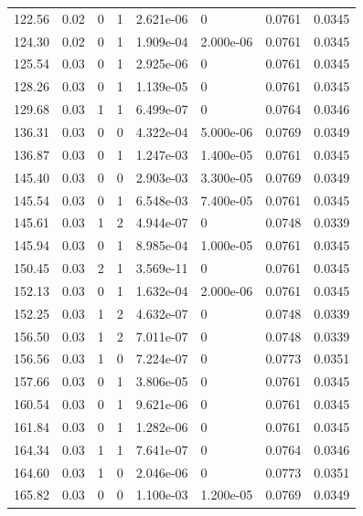 \documentclass[preview]{standalone}
\begin{document}
{{{\begin{tabular}{L{1.2cm}C{1.2cm} C{0.3cm}C{0.5cm} C{1.4cm}C{1.4cm} C{1.4cm}C{1.4cm}}
  122.56  &  0.02  & 0     &  1 &  2.621e-06  & 0  & 0.0761 &  0.0345   \\ 
  124.30  &  0.02  & 0     &  1 &  1.909e-04  & 2.000e-06  & 0.0761 &  0.0345   \\ 
  125.54  &  0.03  & 0     &  1 &  2.925e-06  & 0  & 0.0761 &  0.0345   \\ 
  128.26  &  0.03  & 0     &  1 &  1.139e-05  & 0  & 0.0761 &  0.0345   \\ 
  129.68  &  0.03  & 1     &  1 &  6.499e-07  & 0  & 0.0764 &  0.0346   \\ 
  136.31  &  0.03  & 0     &  0 &  4.322e-04  & 5.000e-06  & 0.0769 &  0.0349   \\ 
  136.87  &  0.03  & 0     &  1 &  1.247e-03  & 1.400e-05  & 0.0761 &  0.0345   \\ 
  145.40  &  0.03  & 0     &  0 &  2.903e-03  & 3.300e-05  & 0.0769 &  0.0349   \\ 
  145.54  &  0.03  & 0     &  1 &  6.548e-03  & 7.400e-05  & 0.0761 &  0.0345   \\ 
  145.61  &  0.03  & 1     &  2 &  4.944e-07  & 0  & 0.0748 &  0.0339   \\ 
  145.94  &  0.03  & 0     &  1 &  8.985e-04  & 1.000e-05  & 0.0761 &  0.0345   \\ 
  150.45  &  0.03  & 2     &  1 &  3.569e-11  & 0  & 0.0761 &  0.0345   \\ 
  152.13  &  0.03  & 0     &  1 &  1.632e-04  & 2.000e-06  & 0.0761 &  0.0345   \\ 
  152.25  &  0.03  & 1     &  2 &  4.632e-07  & 0  & 0.0748 &  0.0339   \\ 
  156.50  &  0.03  & 1     &  2 &  7.011e-07  & 0  & 0.0748 &  0.0339   \\ 
  156.56  &  0.03  & 1     &  0 &  7.224e-07  & 0  & 0.0773 &  0.0351   \\ 
  157.66  &  0.03  & 0     &  1 &  3.806e-05  & 0  & 0.0761 &  0.0345   \\ 
  160.54  &  0.03  & 0     &  1 &  9.621e-06  & 0  & 0.0761 &  0.0345   \\ 
  161.84  &  0.03  & 0     &  1 &  1.282e-06  & 0  & 0.0761 &  0.0345   \\ 
  164.34  &  0.03  & 1     &  1 &  7.641e-07  & 0  & 0.0764 &  0.0346   \\ 
  164.60  &  0.03  & 1     &  0 &  2.046e-06  & 0  & 0.0773 &  0.0351   \\ 
  165.82  &  0.03  & 0     &  0 &  1.100e-03  & 1.200e-05  & 0.0769 &  0.0349   \\ 

\end{tabular}}}}
\end{document}
